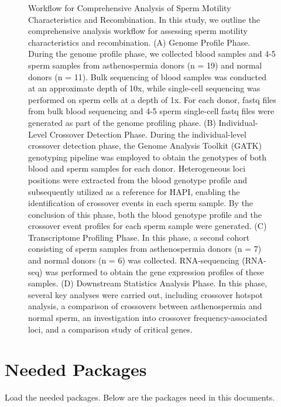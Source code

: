 \documentclass[
  letterpaper,
  DIV=11,
  numbers=noendperiod]{scrreprt}
\begin{document}
\begin{figure}
\caption{Workflow for Comprehensive Analysis of Sperm Motility
Characteristics and Recombination. In this study, we outline the
comprehensive analysis workflow for assessing sperm motility
characteristics and recombination. (A) Genome Profile Phase. During the
genome profile phase, we collected blood samples and 4-5 sperm samples
from asthenospermia donors (n = 19) and normal donors (n = 11). Bulk
sequencing of blood samples was conducted at an approximate depth of
10x, while single-cell sequencing was performed on sperm cells at a
depth of 1x. For each donor, fastq files from bulk blood sequencing and
4-5 sperm single-cell fastq files were generated as part of the genome
profiling phase. (B) Individual-Level Crossover Detection Phase. During
the individual-level crossover detection phase, the Genome Analysis
Toolkit (GATK) genotyping pipeline was employed to obtain the genotypes
of both blood and sperm samples for each donor. Heterogeneous loci
positions were extracted from the blood genotype profile and
subsequently utilized as a reference for HAPI, enabling the
identification of crossover events in each sperm sample. By the
conclusion of this phase, both the blood genotype profile and the
crossover event profiles for each sperm sample were generated. (C)
Transcriptome Profiling Phase. In this phase, a second cohort consisting
of sperm samples from asthenospermia donors (n = 7) and normal donors (n
= 6) was collected. RNA-sequencing (RNA-seq) was performed to obtain the
gene expression profiles of these samples. (D) Downstream Statistics
Analysis Phase. In this phase, several key analyses were carried out,
including crossover hotspot analysis, a comparison of crossovers between
asthenospermia and normal sperm, an investigation into crossover
frequency-associated loci, and a comparison study of critical genes.}

\end{figure}


\hypertarget{needed-packages}{%
\chapter{Needed Packages}\label{needed-packages}}

Load the needed packages. Below are the packages need in this documents.
\end{document}
